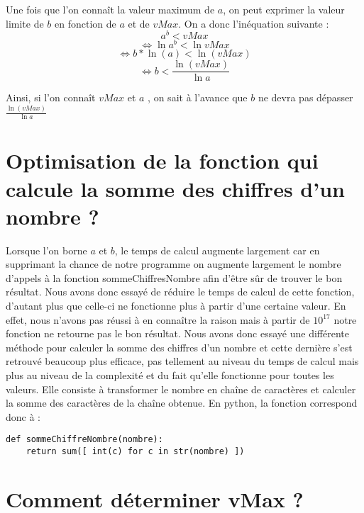 \documentclass{article}
\begin{document}
Une fois que l'on connaît la valeur maximum de $a$, on peut exprimer la valeur limite de $b$ en fonction de $a$ et de $vMax$. On a donc l'inéquation suivante :  \[ a^{b} < vMax \]
 \[ \Leftrightarrow \ln{a^{b}} < \ln{vMax} \]
\[ \Leftrightarrow b*\ln(a) < \ln(vMax)  \]
\[ \Leftrightarrow b < \frac{\ln(vMax)}{\ln{a}}  \]

Ainsi, si l'on connaît $vMax$ et $a$ , on sait à l'avance que $b$ ne devra pas dépasser $\frac{\ln(vMax)}{\ln{a}}$

\section{Optimisation de la fonction qui calcule la somme des chiffres d'un nombre ?}

Lorsque l'on borne $a$ et $b$, le temps de calcul augmente largement car en supprimant la chance de notre programme on augmente largement le nombre d'appels à la fonction sommeChiffresNombre afin d'être sûr de trouver le bon résultat. Nous avons donc essayé de réduire le temps de calcul de cette fonction, d'autant plus que celle-ci ne fonctionne plus à partir d'une certaine valeur. En effet, nous n'avons pas réussi à en connaître la raison mais à partir de $10^{17}$ notre fonction ne retourne pas le bon résultat. Nous avons donc essayé une différente méthode pour calculer la somme des chiffres d'un nombre et cette dernière s'est retrouvé beaucoup plus efficace, pas tellement au niveau du temps de calcul mais plus au niveau de la complexité et du fait qu'elle fonctionne pour toutes les valeurs. Elle consiste à transformer le nombre en chaîne de caractères et calculer la somme des caractères de la chaîne obtenue. En python, la fonction correspond donc à :
\begin{lstlisting}
def sommeChiffreNombre(nombre):
    return sum([ int(c) for c in str(nombre) ])
\end{lstlisting}

\section{Comment déterminer vMax ?}
\end{document}
